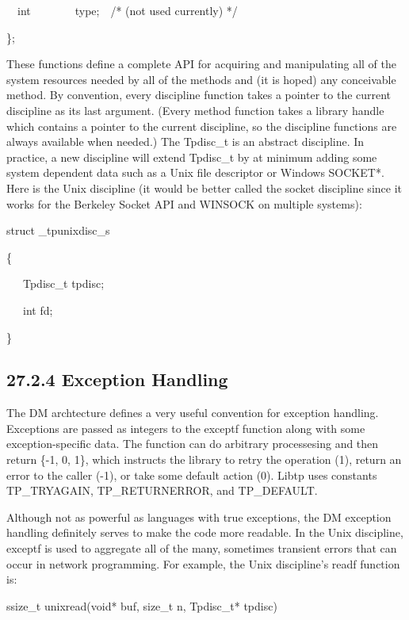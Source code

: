 {\ttfamily\mdseries
\ \ int\ \ \ \ \ \ \ \ type;\ \ /* (not used currently) */}

{\ttfamily\mdseries
\};}


\bigskip


These functions define a complete API for acquiring and manipulating
all of the system resources needed by all of the methods and (it is
hoped) any conceivable method. By convention, every discipline
function takes a pointer to the current discipline as its last
argument. (Every method function takes a library handle which contains
a pointer to the current discipline, so the discipline functions are
always available when needed.) The Tpdisc\_t is an abstract
discipline. In practice, a new discipline will extend Tpdisc\_t by at
minimum adding some system dependent data such as a Unix file
descriptor or Windows SOCKET*. Here is the
{\textquotedbl}Unix{\textquotedbl} discipline (it would be better
called the socket discipline since it works for the Berkeley Socket
API and WINSOCK on multiple systems):

{\ttfamily\mdseries
struct \_tpunixdisc\_s}

{\ttfamily\mdseries
\{}

{\ttfamily\mdseries
\ \ \ Tpdisc\_t tpdisc;}

{\ttfamily\mdseries
\ \ \ int fd;}

{\ttfamily\mdseries
\}}

\subsection[27.2.4 Exception Handling]{27.2.4 Exception Handling}

The DM archtecture defines a very useful convention for exception
handling. Exceptions are passed as integers to the exceptf function
along with some exception-specific data. The function can do arbitrary
processesing and then return \{-1, 0, 1\}, which instructs the library
to retry the operation (1), return an error to the caller (-1), or
take some default action (0). Libtp uses constants TP\_TRYAGAIN,
TP\_RETURNERROR, and TP\_DEFAULT.

Although not as powerful as languages with true exceptions, the DM
exception handling definitely serves to make the code more
readable. In the Unix discipline, exceptf is used to aggregate all of
the many, sometimes transient errors that can occur in network
programming. For example, the Unix discipline's readf function is:

{\ttfamily\mdseries
ssize\_t unixread(void* buf, size\_t n, Tpdisc\_t* tpdisc)}

